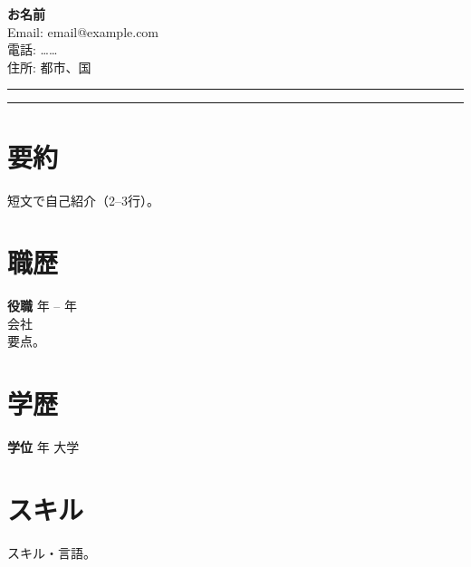 \documentclass[11pt,a4paper]{article}
\begin{document}
\begin{minipage}[t]{0.72\textwidth}
\vspace{0pt}
{\LARGE \textbf{お名前}}\\[0.25em]
Email: email@example.com \\
電話: …… \\
住所: 都市、国
\end{minipage}
\begin{minipage}[t]{0.25\textwidth}
\vspace{0pt}
\raggedleft
\rule{2.8cm}{3.2cm}
\end{minipage}
\vspace{0.5em}
\noindent\rule{\textwidth}{0.4pt}
\section*{要約}
短文で自己紹介（2--3行）。
\section*{職歴}
\textbf{役職} \hfill 年 -- 年 \\
会社 \\
要点。
\section*{学歴}
\textbf{学位} \hfill 年 \quad 大学
\section*{スキル}
スキル・言語。
\end{document}
